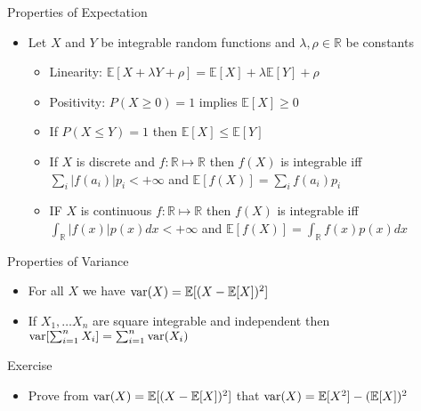\documentclass{beamer}
\begin{document}
\begin{frame}{Properties of Expectation} 
\begin{itemize} 
 \item Let $X$ and $Y$ be integrable random functions and $\lambda, \rho \in \mathbb{R}$ be constants
 \begin{itemize}
 \item Linearity: $\mathbb{E}[X + \lambda Y + \rho] = \mathbb{E}[X] +  \lambda \mathbb{E}[Y] + \rho$ 
 \item Positivity: $P(X \geq 0) = 1$ implies $\mathbb{E}[X] \geq 0$ 
 \item If $P(X \leq Y) = 1$ then $\mathbb{E}[X] \leq \mathbb{E}[Y]$
\item If $X$ is discrete and $f: \mathbb{R} \mapsto \mathbb{R}$ then $f(X)$ is integrable iff $\sum_i |f(a_i)| p_i < + \infty$ and $\mathbb{E}[f(X)] =  \sum_i f(a_i) p_i$ 
\item IF $X$ is continuous $f: \mathbb{R} \mapsto \mathbb{R}$ then $f(X)$ is integrable iff $\int_\mathbb{R} |f(x)| p(x) dx < +\infty$ and $\mathbb{E}[f(X)] = \int_\mathbb{R} f(x)p(x) dx $ 
\end{itemize} 
\end{itemize} 
\end{frame}

\begin{frame}{Properties of Variance} 
\begin{itemize} 
 \item For all $X$ we have $\mbox{var}(X) = \mathbb{E}[(X - \mathbb{E}[X])^2]$ 
\item If $X_1, \ldots X_n$ are square integrable and independent then $\mbox{var}[\sum_{i=1}^n X_i] = \sum_{i=1}^n \mbox{var}(X_i)$ 
\end{itemize}
\end{frame}

\begin{frame}{Exercise}  
\begin{itemize}
 \item Prove from  $\mbox{var}(X) = \mathbb{E}[(X - \mathbb{E}[X])^2]$ that $\mbox{var}(X) = \mathbb{E}[X^2] - (\mathbb{E}[X])^2$ 
\end{itemize}
\end{frame}
\end{document}
